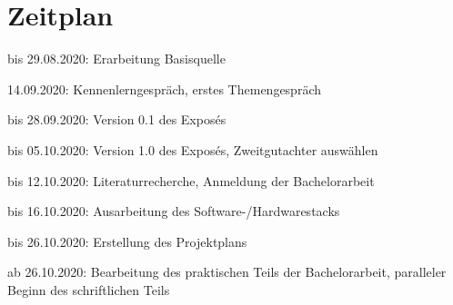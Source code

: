 \documentclass[11pt]{article}
\newcommand{\cmark}{\ding{51}}%
\newcommand{\done}{\rlap{$\square$}{\raisebox{2pt}{\large\hspace{1pt}\cmark}}%
\hspace{-2.5pt}}
\begin{document}
    \section{Zeitplan}
    \begin{todolist}
        \item[\done] bis 29.08.2020: Erarbeitung Basisquelle
        \item[\done] 14.09.2020: Kennenlerngespräch, erstes Themengespräch
        \item[\done] bis 28.09.2020: Version 0.1 des Exposés
        \item bis 05.10.2020: Version 1.0 des Exposés, Zweitgutachter auswählen
        \item bis 12.10.2020: Literaturrecherche, Anmeldung der Bachelorarbeit
        \item bis 16.10.2020: Ausarbeitung des Software-/Hardwarestacks
        \item bis 26.10.2020: Erstellung des Projektplans
        \item ab 26.10.2020: Bearbeitung des praktischen Teils der Bachelorarbeit, paralleler Beginn des
        schriftlichen Teils
    \end{todolist}

    \listoffigures

    ~\nocite{*}
    
    
\end{document}
